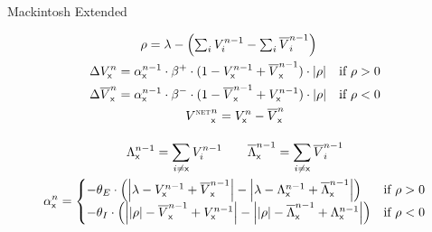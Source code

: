 \documentclass[border=10pt,varwidth]{standalone}
\begin{document}
\newcommand{\eks}{\textsf{x}}
\newcommand{\longlambda}{\rlap{$\,\lambda$}\phantom{\big| \rho \big|}}
\newcommand{\longI}{\rlap{$I$}\phantom{E}}

\begin{center}
	\huge
	\sffamily
	Mackintosh Extended
\end{center}
\begin{gather*}
	\begin{aligned}
		\rho &= \lambda - \left( \textstyle\sum_i V_i^{n - 1} - \textstyle\sum_i \overline{V}_i^{n - 1} \right)
	\end{aligned} \\
	\begin{aligned}
		\Delta V_\eks^n &= \alpha_\eks^{n - 1} \cdot \beta^+ \cdot (1 - V_\eks^{n - 1} + \overline{V}_\eks^{n - 1}) \cdot \left| \rho \right| & \text{if } \rho > 0 \\
		 \Delta \overline{V}_\eks^n &= \alpha_\eks^{n - 1} \cdot \beta^- \cdot (1 - \overline{V}_\eks^{n - 1} + V_\eks^{n - 1}) \cdot \left| \rho \right| & \text{if } \rho < 0
	\end{aligned} \\
	{V^{\text{\tiny\scshape NET}}}_\eks^n = V_\eks^n - \overline{V}_\eks^n \\[1em]
	\Lambda^{n - 1}_\eks = \sum_{i \neq \eks} V^{n - 1}_i \qquad
	\overline{\Lambda}^{n - 1}_\eks = \sum_{i \neq \eks} \overline{V}^{n - 1}_i \\
	\alpha_\eks^n =
		\begin{cases}
			- \theta_E \cdot \left( \left| \lambda - V^{n - 1}_\eks + \overline{V}^{n - 1}_\eks \right| - \left| \lambda - \Lambda^{n - 1}_\eks + \overline{\Lambda}^{n - 1}_\eks \right| \right) &\text{if } \rho > 0 \\
			- \theta_I \cdot \left( \left| \left| \rho \right| - \overline{V}^{n - 1}_\eks + V^{n - 1}_\eks \right| - \left| \left| \rho \right| - \overline{\Lambda}^{n - 1}_\eks + \Lambda^{n - 1}_\eks \right| \right) &\text{if } \rho < 0
		\end{cases}
\end{gather*}

\nocite{mackintosh_original}

\end{document}
